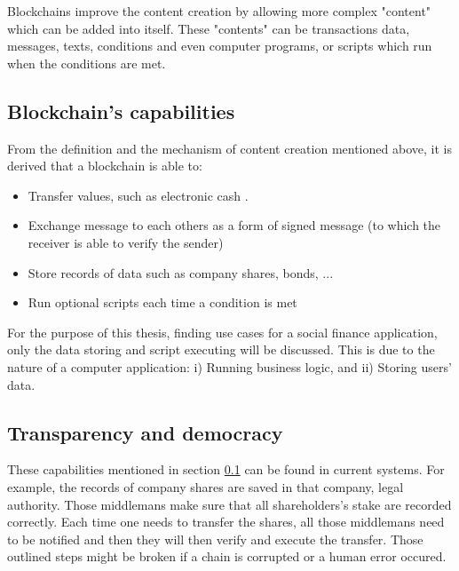 \documentclass[twoside,draftfooter]{tutthesis} %
\begin{document}
Blockchains improve the content creation by allowing more complex "content" which can be added into itself. These "contents" can be transactions data, messages, texts, conditions and even computer programs, or scripts which run when the conditions are met.

\subsection{Blockchain's capabilities}
\label{blockchainCapabilities}

From the definition and the mechanism of content creation mentioned above, it is derived that a blockchain is able to:

\begin{itemize}
    \item Transfer values, such as electronic cash \citep{RefWorks:doc:BitcoinWhitepaper}.
    \item Exchange message to each others as a form of signed message (to which the receiver is able to verify the sender) \citep{RefWorks:doc:EthereumWhitepaper}
    \item Store records of data such as company shares, bonds, ... \citep{RefWorks:doc:SecuritiesOnBlockchain}
    \item Run optional scripts each time a condition is met \citep[s.~20]{RefWorks:doc:MasteringBlockchain}
\end{itemize}

For the purpose of this thesis, finding use cases for a social finance application, only the data storing and script executing will be discussed. This is due to the nature of a computer application: i) Running business logic, and ii) Storing users' data.

\subsection{Transparency and democracy}

These capabilities mentioned in section \ref{blockchainCapabilities} can be found in current systems. For example, the records of company shares are saved in that company, legal authority. Those middlemans make sure that all shareholders's stake are recorded correctly. Each time one needs to transfer the shares, all those middlemans need to be notified and then they will then verify and execute the transfer. Those outlined steps might be broken if a chain is corrupted or a human error occured.
\end{document}
